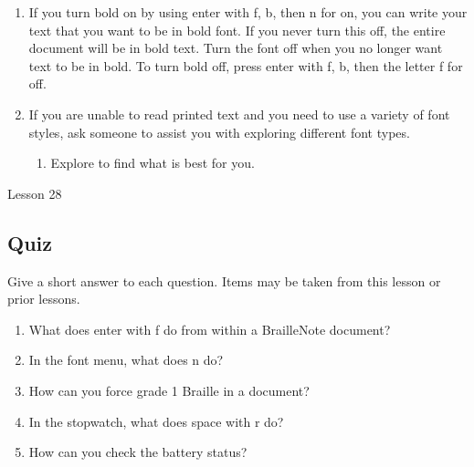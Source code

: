 \documentclass[10pt,letterpaper,twoside]{report}
\begin{document}
{{{{\begin{enumerate}
\begin{enumerate}
		      \item landscape
	      \end{enumerate}
	      
	\item If you turn bold on by using enter with f, b, then n for on, you can write your text that you want to be in bold font.  If you never turn this off, the entire document will be in bold text.  Turn the font off when you no longer want text to be in bold.  To turn bold off, press enter with f, b, then the letter f for off.
	      
	\item If you are unable to read printed text and you need to use a variety of font styles, ask someone to assist you with exploring different font types.
	      
	      \begin{enumerate}
		      \item Explore to find what is best for you.
	      \end{enumerate}
\end{enumerate}











Lesson 28

\subsection{Quiz}



Give a short answer to each question. Items may be taken from this lesson or prior lessons.



\begin{enumerate}
	\item What does enter with f do from within a BrailleNote document?
	      
	\item In the font menu, what does n do?
	      
	\item How can you force grade 1 Braille in a document?
	      
	\item In the stopwatch, what does space with r do?
	      
	\item How can you check the battery status?
	      

\end{enumerate}}}}}
\end{document}
